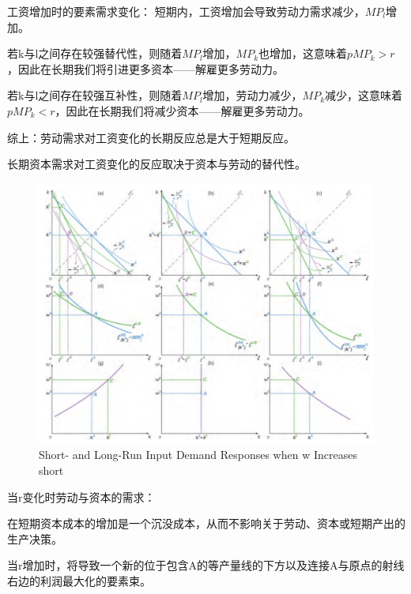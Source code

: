 \documentclass{article}
\begin{document}
\hspace*{\fill}

工资增加时的要素需求变化：
短期内，工资增加会导致劳动力需求减少，$ MP_l $增加。

若k与l之间存在较强替代性，则随着$ MP_l $增加，$ MP_k $也增加，这意味着$ pMP_k>r $，因此在长期我们将引进更多资本——解雇更多劳动力。

若k与l之间存在较强互补性，则随着$ MP_l $增加，劳动力减少，$ MP_k $减少，这意味着$ pMP_k<r $，因此在长期我们将减少资本——解雇更多劳动力。

综上：劳动需求对工资变化的长期反应总是大于短期反应。

\hspace*{\fill}

长期资本需求对工资变化的反应取决于资本与劳动的替代性。

\begin{figure}[H] %
	\centering %
	\includegraphics[width=1\textwidth]{13_9} %
	\caption{Short- and Long-Run Input Demand Responses when w Increases
		short} %
	\label{Fig.main10} %
\end{figure}

\hspace*{\fill}

当r变化时劳动与资本的需求：

在短期资本成本的增加是一个沉没成本，从而不影响关于劳动、资本或短期产出的生产决策。

当r增加时，将导致一个新的位于包含A的等产量线的下方以及连接A与原点的射线右边的利润最大化的要素束。
\end{document}
